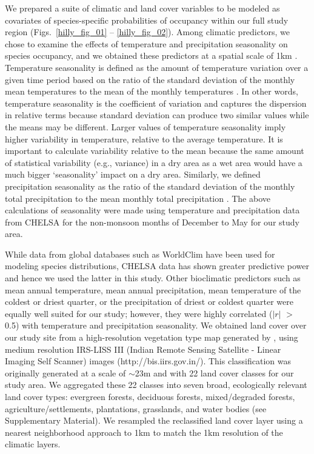 We prepared a suite of climatic and land cover variables to be modeled as covariates of species-specific probabilities of occupancy within our full study region (Figs.~\ref{hilly_fig_01} -- \ref{hilly_fig_02}).
Among climatic predictors, we chose to examine the effects of temperature and precipitation seasonality on species occupancy, and we obtained these predictors at a spatial scale of 1km \citep[Climatologies at High resolution for the Earth's Land Surface Areas; CHELSA:][]{karger2017}.
Temperature seasonality is defined as the amount of temperature variation over a given time period based on the ratio of the standard deviation of the monthly mean temperatures to the mean of the monthly temperatures \citep{odonnell2012}.
In other words, temperature seasonality is the coefficient of variation and captures the dispersion in relative terms because standard deviation can produce two similar values while the means may be different.
Larger values of temperature seasonality imply higher variability in temperature, relative to the average temperature.
It is important to calculate variability relative to the mean because the same amount of statistical variability (e.g., variance) in a dry area as a wet area would have a much bigger `seasonality' impact on a dry area.
Similarly, we defined precipitation seasonality as the ratio of the standard deviation of the monthly total precipitation to the mean monthly total precipitation \citep{odonnell2012}.
The above calculations of seasonality were made using temperature and precipitation data from CHELSA for the non-monsoon months of December to May for our study area.

While data from global databases such as WorldClim have been used for modeling species distributions, CHELSA data has shown greater predictive power \citep{karger2017} and hence we used the latter in this study.
Other bioclimatic predictors such as mean annual temperature, mean annual precipitation, mean temperature of the coldest or driest quarter, or the precipitation of driest or coldest quarter were equally well suited for our study; however, they were highly correlated ($|r|$ $>$ 0.5) with temperature and precipitation seasonality.
We obtained land cover over our study site from a high-resolution vegetation type map generated by \citep{roy2015}, using medium resolution IRS-LISS III (Indian Remote Sensing Satellite - Linear Imaging Self Scanner) images (http://bis.iirs.gov.in/).
This classification was originally generated at a scale of $\sim$23m and with 22 land cover classes for our study area.
We aggregated these 22 classes into seven broad, ecologically relevant land cover types: evergreen forests, deciduous forests, mixed/degraded forests, agriculture/settlements, plantations, grasslands, and water bodies (see Supplementary Material).
We resampled the reclassified land cover layer using a nearest neighborhood approach to 1km to match the 1km resolution of the climatic layers.

